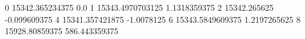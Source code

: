 0 15342.365234375 0.0
1 15343.4970703125 1.1318359375
2 15342.265625 -0.099609375
4 15341.357421875 -1.0078125
6 15343.5849609375 1.2197265625
8 15928.80859375 586.443359375
